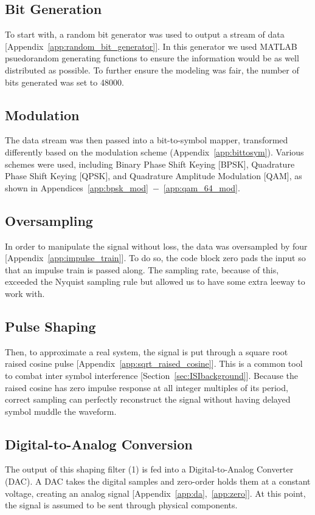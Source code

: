 \documentclass[]{article}
\begin{document}
\subsection{Bit Generation}
\label{sec:bits}
 To start with, a random bit generator was used to output a stream of data [Appendix~\ref{app:random_bit_generator}]. In this generator we used MATLAB psuedorandom generating functions to ensure the information would be as well distributed as possible.  To further ensure the modeling was fair, the number of bits generated was set to 48000. \\
\subsection{Modulation}
\label{sec:modulation}
The data stream was then passed into a bit-to-symbol mapper, transformed differently based on the modulation scheme (Appendix~\ref{app:bittosym}).  Various schemes were used, including Binary Phase Shift Keying [BPSK], Quadrature Phase Shift Keying [QPSK], and Quadrature Amplitude Modulation [QAM], as shown in Appendices~\ref{app:bpsk_mod}~$-$~\ref{app:qam_64_mod}. \\
\subsection{Oversampling}
\label{sec:oversample}
In order to manipulate the signal without loss, the data was oversampled by four [Appendix~\ref{app:impulse_train}].  To do so, the code block zero pads the input so that an impulse train is passed along.  The sampling rate, because of this, exceeded the Nyquist sampling rule but allowed us to have some extra leeway to work with.   

\subsection{Pulse Shaping}
\label{sec:srrc}
Then, to approximate a real system, the signal is put through a square root raised cosine pulse [Appendix~\ref{app:sqrt_raised_cosine}].  This is a common tool to combat inter symbol interference [Section~\ref{sec:ISIbackground}].  Because the raised cosine has zero impulse response at all integer multiples of its period, correct sampling can perfectly reconstruct the signal without having delayed symbol muddle the waveform. \\

\subsection{Digital-to-Analog Conversion}
\label{sec:da}
The output of this shaping filter (1) is fed into a Digital-to-Analog Converter (DAC).  A DAC takes the digital samples and zero-order holds them at a constant voltage, creating an analog signal [Appendix~\ref{app:da},~\ref{app:zero}].  At this point, the signal is assumed to be sent through physical components.
\end{document}
